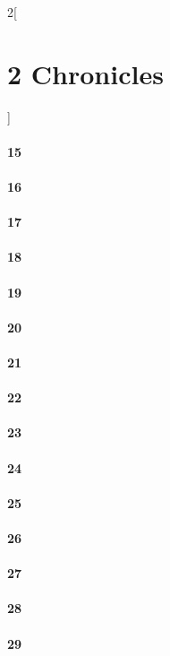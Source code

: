 \documentclass{book}
\begin{document}
\begin{multicols}{2}[\part{2 Chronicles}]
\subsection*{15}
\subsection*{16}
\subsection*{17}
\subsection*{18}
\subsection*{19}
\subsection*{20}
\subsection*{21}
\subsection*{22}
\subsection*{23}
\subsection*{24}
\subsection*{25}
\subsection*{26}
\subsection*{27}
\subsection*{28}
\subsection*{29}

\end{multicols}
\end{document}
